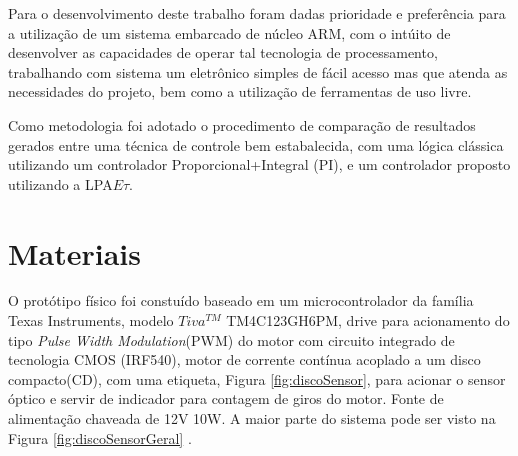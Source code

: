 Para o desenvolvimento deste trabalho foram dadas prioridade e
preferência para a utilização de um sistema embarcado de núcleo ARM,
com o intúito de desenvolver as capacidades de operar tal tecnologia
de processamento, trabalhando com sistema um eletrônico simples de fácil acesso mas que atenda as necessidades do projeto, bem como a utilização de ferramentas de uso livre.

Como metodologia foi adotado o procedimento de comparação de
resultados gerados entre uma técnica de controle bem estabalecida,
com uma lógica clássica utilizando um controlador
Proporcional+Integral (PI), e um controlador proposto
utilizando a LPA$E\tau$. 







\section{Materiais}

O protótipo físico foi constuído baseado em um microcontrolador da
família Texas Instruments, modelo $Tiva^{TM}$ TM4C123GH6PM, drive para
acionamento do tipo \emph{Pulse Width Modulation}(PWM) do motor com
circuito integrado de tecnologia CMOS (IRF540), motor de corrente
contínua acoplado a um disco compacto(CD), com uma etiqueta,
Figura \ref{fig:discoSensor}, para acionar o sensor óptico e servir de
indicador para contagem de giros do motor.
Fonte de alimentação chaveada de 12V 10W.
A maior parte do sistema pode ser visto na Figura \ref{fig:discoSensorGeral} .


